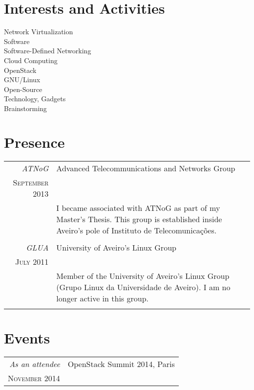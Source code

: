 \documentclass[a4paper,10pt]{article} %
\begin{document}

\section{Interests and Activities}
Network Virtualization\\
Software\\
Software-Defined Networking\\
Cloud Computing\\
OpenStack\\
GNU/Linux\\
Open-Source\\
Technology, Gadgets\\
Brainstorming\\

%

\section{Presence}
\begin{tabular}{r|p{11cm}}
	\emph{ATNoG} & Advanced Telecommunications and Networks Group \\
	\textsc{September 2013} & \\ 
	& \footnotesize{I became associated with ATNoG as part of my Master's Thesis. This group is established inside Aveiro's pole of Instituto de Telecomunicações.}\\
	\multicolumn{2}{c}{} \\
	\emph{GLUA} & University of Aveiro's Linux Group \\
	\textsc{July 2011} & \\ 
	& \footnotesize{Member of the University of Aveiro's Linux Group (Grupo Linux da Universidade de Aveiro). I am no longer active in this group.}\\
	\multicolumn{2}{c}{}\\
\end{tabular}


\section{Events}
\begin{tabular}{r|p{11cm}}
	\emph{As an attendee} & OpenStack Summit 2014, Paris \\
	\textsc{November 2014} & \\ 
\end{tabular} \\
\end{document}
